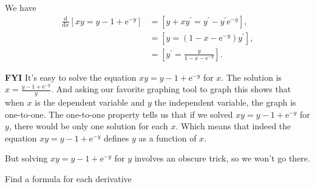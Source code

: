 \documentclass[12pt,fleqn,answers]{exam}
\begin{document}
\begin{questions}
    \begin{solution}[2.5in]
    We have
    \begin{align*}
      \frac{\mathrm{d}}{\mathrm{d} x} \left [ x y = y - 1 + \mathrm{e}^{-y} \right] &= \left[ y + x y^\prime = y^\prime - y^\prime \mathrm{e}^{-y} \right], \\
      &= \left[ y  =  (1-x  - \mathrm{e}^{-y}) y^\prime  \right], \\
      &= \left[ y^\prime = \frac{y}{1-x - \mathrm{e}^{-y}} \right].
    \end{align*}

    \textbf{FYI} It's easy to solve the equation $x y = y - 1 + \mathrm{e}^{-y} $
    for $x$. The solution is $x = \frac{y-1 +  \mathrm{e}^{-y}}{y}$. 
    And asking our favorite graphing tool to graph this shows that
    when $x$ is the dependent variable and $y$ the independent variable,
    the graph is one-to-one.  The one-to-one property tells us that
    if we solved $x y = y - 1 + \mathrm{e}^{-y} $ for $y$, there would be
    only one solution for each $x$. Which means that indeed the
    equation $x y = y - 1 + \mathrm{e}^{-y} $ defines $y$ as
    a function of $x$.

    But solving $x y = y - 1 + \mathrm{e}^{-y} $ for $y$ involves
    an obscure trick, so we won't go there.
    
    \end{solution}


    \question Find a formula for each derivative
\end{questions}
\end{document}
